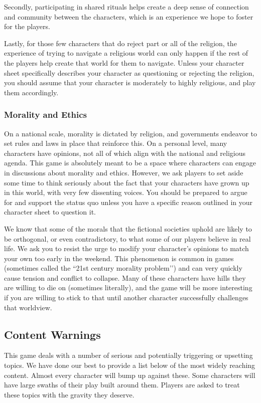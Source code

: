 \documentclass[sheet]{GL2020}
\begin{document}
Secondly, participating in shared rituals helps create a deep sense of connection and community between the characters, which is an experience we hope to foster for the players. 

Lastly, for those few characters that do reject part or all of the religion, the experience of trying to navigate a religious world can only happen if the rest of the players help create that world for them to navigate. Unless your character sheet specifically describes your character as questioning or rejecting the religion, you should assume that your character is moderately to highly religious, and play them accordingly. 

\subsubsection{Morality and Ethics}
On a national scale, morality is dictated by religion, and governments endeavor to set rules and laws in place that reinforce this. On a personal level, many characters have opinions, not all of which align with the national and religious agenda. This game is absolutely meant to be a space where characters can engage in discussions about morality and ethics. However, we ask players to set aside some time to think seriously about the fact that your characters have grown up in this world, with very few dissenting voices. You should be prepared to argue for and support the status quo unless you have a specific reason outlined in your character sheet to question it.

We know that some of the morals that the fictional societies uphold are likely to be orthogonal, or even contradictory, to what some of our players believe in real life. We ask you to resist the urge to modify your character's opinions to match your own too early in the weekend. This phenomenon is common in games (sometimes called the ``21st century morality problem'’) and can very quickly cause tension and conflict to collapse. Many of these characters have hills they are willing to die on (sometimes literally), and the game will be more interesting if you are willing to stick to that until another character successfully challenges that worldview. 

\subsection{Content Warnings}
This game deals with a number of serious and potentially triggering or upsetting topics. We have done our best to provide a list below of the most widely reaching content. Almost every character will bump up against these. Some characters will have large swaths of their play built around them. Players are asked to treat these topics with the gravity they deserve.
\end{document}

